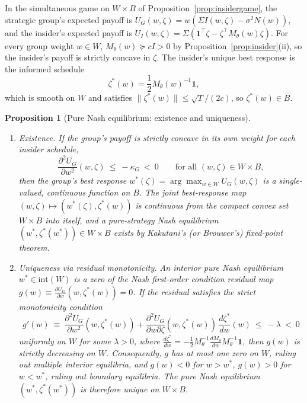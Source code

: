 \documentclass[12pt]{article}
\newtheorem{proposition}[theorem]{Proposition}
\theoremstyle{definition}
\theoremstyle{remark}
\begin{document}
In the simultaneous game on $W\times B$ of Proposition~\ref{prop:insidergame}, the strategic group's expected payoff is $U_G(w,\zeta)=w(\Sigma I(w,\zeta)-\sigma^2 N(w))$, and the insider's expected payoff is $U_I(w,\zeta)=\Sigma(\mathbf 1^\top\zeta-\zeta^\top M_\theta(w)\zeta)$. For every group weight $w\in W$, $M_\theta(w)\succeq c I>0$ by Proposition~\ref{prop:insider}(ii), so the insider's payoff is strictly concave in $\zeta$. The insider's unique best response is the informed schedule
\[
\zeta^*(w) = \frac12 M_\theta(w)^{-1}\mathbf 1,
\]
which is smooth on $W$ and satisfies $\|\zeta^*(w)\|\le\sqrt T/(2c)$, so $\zeta^*(w)\in B$.

\begin{proposition}[Pure Nash equilibrium: existence and uniqueness]\label{prop:nashqc}
\begin{enumerate}[label=(\roman*),itemsep=1pt]
\item \emph{Existence.} If the group's payoff is strictly concave in its own weight for each insider schedule,
\[
\frac{\partial^2 U_G}{\partial w^2}(w,\zeta)\ \le\ -\kappa_G\ <\ 0\qquad\text{for all }(w,\zeta)\in W\times B,
\]
then the group's best response $w^*(\zeta)=\arg\max_{w\in W}U_G(w,\zeta)$ is a single-valued, continuous function on $B$. The joint best-response map $(w,\zeta)\mapsto(w^*(\zeta),\zeta^*(w))$ is continuous from the compact convex set $W\times B$ into itself, and a pure-strategy Nash equilibrium $(w^*,\zeta^*(w^*))\in W\times B$ exists by Kakutani's (or Brouwer's) fixed-point theorem.
\item \emph{Uniqueness via residual monotonicity.} An interior pure Nash equilibrium $w^*\in\mathrm{int}(W)$ is a zero of the Nash first-order condition residual map $g(w)\equiv\frac{\partial U_G}{\partial w}(w,\zeta^*(w))=0$. If the residual satisfies the strict monotonicity condition
\[
g'(w)\ \equiv\ \frac{\partial^2 U_G}{\partial w^2}(w,\zeta^*(w)) + \frac{\partial^2 U_G}{\partial w\partial\zeta}(w,\zeta^*(w))\,\frac{d\zeta^*}{dw}(w)\ \le\ -\lambda\ <\ 0
\]
uniformly on $W$ for some $\lambda>0$, where $\frac{d\zeta^*}{dw}=-\frac12 M_\theta^{-1}\frac{dM_\theta}{dw}M_\theta^{-1}\mathbf 1$, then $g(w)$ is strictly decreasing on $W$. Consequently, $g$ has at most one zero on $W$, ruling out multiple interior equilibria, and $g(w)<0$ for $w>w^*$, $g(w)>0$ for $w<w^*$, ruling out boundary equilibria. The pure Nash equilibrium $(w^*,\zeta^*(w^*))$ is therefore unique on $W\times B$.
\end{enumerate}
\end{proposition}
\end{document}
